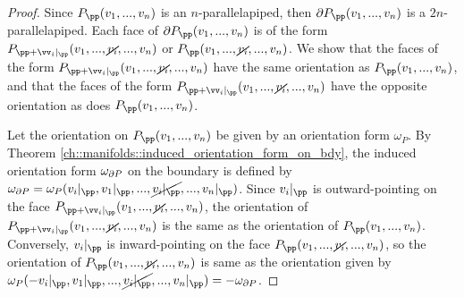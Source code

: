 \begin{proof}
    Since $P_\pp(v_1, ..., v_n)$ is an $n$-parallelapiped, then $\pd P_\pp(v_1, ..., v_n)$ is a $2n$-parallelapiped. Each face of $\pd P_\pp(v_1, ..., v_n)$ is of the form $P_{\pp + \vv_i|_\pp}(v_1, ..., \cancel{v_i}, ..., v_n)$ or $P_{\pp}(v_1, ..., \cancel{v_i}, ..., v_n)$. We show that the faces of the form $P_{\pp + \vv_i|_\pp}(v_1, ..., \cancel{v_i}, ..., v_n)$ have the same orientation as $P_\pp(v_1, ..., v_n)$, and that the faces of the form $P_{\pp + \vv_i|_\pp}(v_1, ..., \cancel{v_i}, ..., v_n)$ have the opposite orientation as does $P_\pp(v_1, ..., v_n)$.
    
    Let the orientation on $P_\pp(v_1, ..., v_n)$ be given by an orientation form $\omega_P$. By Theorem \ref{ch::manifolds::induced_orientation_form_on_bdy}, the induced orientation form $\omega_{\partial P}$ on the boundary is defined by $\omega_{\pd P} = \omega_P(v_i|_\pp, v_1|_\pp, ..., \cancel{v_i|_\pp}, ..., v_n|_\pp)$. Since $v_i|_\pp$ is outward-pointing on the face $P_{\pp + \vv_i|_\pp}(v_1, ..., \cancel{v_i}, ..., v_n)$, the orientation of $P_{\pp + \vv_i|_\pp}(v_1, ..., \cancel{v_i}, ..., v_n)$ is the same as the orientation of $P_\pp(v_1, ..., v_n)$. Conversely, $v_i|_\pp$ is inward-pointing on the face $P_{\pp}(v_1, ..., \cancel{v_i}, ..., v_n)$, so the orientation of $P_{\pp}(v_1, ..., \cancel{v_i}, ..., v_n)$ is same as the orientation given by $\omega_P(-v_i|_\pp, v_1|_\pp, ..., \cancel{v_i|_\pp}, ..., v_n|_\pp) = -\omega_{\pd P}$.
\end{proof}

